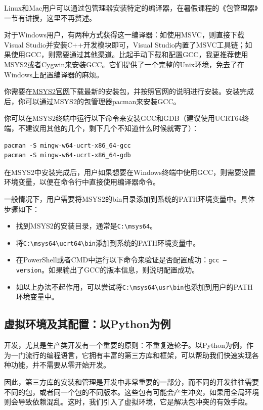 \documentclass[../main.tex]{subfiles}
\begin{document}
Linux和Mac用户可以通过包管理器安装特定的编译器，在暑假课程的《包管理器》一节有讲授，这里不再赘述。

对于Windows用户，有两种方式获得这一编译器：如使用MSVC，则直接下载Visual Studio并安装C++开发模块即可，Visual Studio内置了MSVC工具链；如果使用GCC，则需要通过其他渠道。比起手动下载和配置GCC，我更推荐使用MSYS2或者Cygwin来安装GCC。它们提供了一个完整的Unix环境，免去了在Windows上配置编译器的麻烦。

你需要在\href{https://www.msys2.org/}{MSYS2官网}下载最新的安装包，并按照官网的说明进行安装。安装完成后，你可以通过MSYS2的包管理器pacman来安装GCC。

你可以在MSYS2终端中运行以下命令来安装GCC和GDB（建议使用UCRT64终端，不建议用其他的几个，剩下几个不知道什么时候就寄了）：

\begin{verbatim}
pacman -S mingw-w64-ucrt-x86_64-gcc
pacman -S mingw-w64-ucrt-x86_64-gdb
\end{verbatim}

在MSYS2中安装完成后，用户如果想要在Windows终端中使用GCC，则需要设置环境变量，以便在命令行中直接使用编译器命令。

一般情况下，用户需要将MSYS2的bin目录添加到系统的PATH环境变量中。具体步骤如下：

\begin{itemize}
  \item 找到MSYS2的安装目录，通常是\texttt{C:\textbackslash msys64}。
  \item 将\texttt{C:\textbackslash msys64\textbackslash ucrt64\textbackslash bin}添加到系统的PATH环境变量中。
  \item 在PowerShell或者CMD中运行以下命令来验证是否配置成功：\texttt{gcc --version}。如果输出了GCC的版本信息，则说明配置成功。
  \item 如以上办法不起作用，可以尝试将\texttt{C:\textbackslash msys64\textbackslash usr\textbackslash bin}也添加到用户的PATH环境变量中。
\end{itemize}

\subsection{虚拟环境及其配置：以Python为例}

开发，尤其是生产类开发有一个重要的原则：不重复造轮子。以Python为例，作为一门流行的编程语言，它拥有丰富的第三方库和框架，可以帮助我们快速实现各种功能，并不需要从零开始开发。

因此，第三方库的安装和管理是开发中非常重要的一部分，而不同的开发往往需要不同的包，或者同一个包的不同版本。这些包有可能会产生冲突，如果用全局环境则会导致依赖混乱。这时，我们引入了虚拟环境，它是解决包冲突的有效手段。
\end{document}
